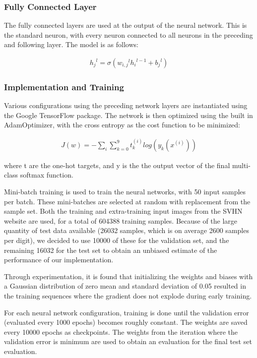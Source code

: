 \documentclass{article} %
\begin{document}
\subsubsection{Fully Connected Layer}

The fully connected layers are used at the output of the neural network. This is the standard neuron, with every neuron connected to all neurons in the preceding and following layer. The model is as follows:

\begin{gather}
{h_{j}}^l = \sigma({w_{i,j}}^{l} {h_{i}}^{l-1} + {b_j}^l) 
\end{gather}

\subsubsection{Implementation and Training}

Various configurations using the preceding network layers are instantiated using the Google TensorFlow package. The network is then optimized using the built in AdamOptimizer, with the cross entropy as the cost function to be minimized:

\begin{gather}
J(w) = - \sum_{i}{\sum_{k=0}^{9}{t^{(i)}_k}log(y_k(x^{(i)}))}
\end{gather}

where t are the one-hot targets, and y is the the output vector of the final multi-class softmax function. 

Mini-batch training is used to train the neural networks, with 50 input samples per batch. These mini-batches are selected at random with replacement from the sample set. Both the training and extra-training input images from the SVHN website are used, for a total of 604388 training samples. Because of the large quantity of test data available (26032 samples, which is on average 2600 samples per digit), we decided to use 10000 of these for the validation set, and the remaining 16032 for the test set to obtain an unbiased estimate of the performance of our implementation.

Through experimentation, it is found that initializing the weights and biases with a Gaussian distribution of zero mean and standard deviation of 0.05 resulted in the training sequences where the gradient does not explode during early training. 

For each neural network configuration, training is done until the validation error (evaluated every 1000 epochs) becomes roughly constant. The weights are saved every 10000 epochs as checkpoints. The weights from the iteration where the validation error is minimum are used to obtain an evaluation for the final test set evaluation. 
\end{document}
